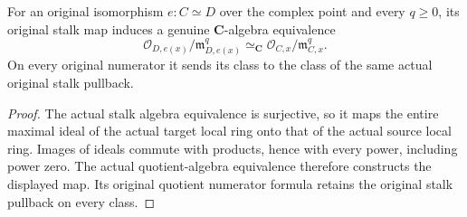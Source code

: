 \begin{theorem}
\label{hir:actual-analytic-subspace-intrinsic-maximal-jets}
\leanok
For an original isomorphism $e:C\simeq D$ over the complex point and every
$q\ge0$, its original stalk map induces a genuine $\mathbf C$-algebra
equivalence
\[
 \mathcal O_{D,e(x)}/\mathfrak m_{D,e(x)}^q
   \simeq_{\mathbf C} \mathcal O_{C,x}/\mathfrak m_{C,x}^q.
\]
On every original numerator it sends its class to the class of the same
actual original stalk pullback.
\end{theorem}
\begin{proof}
The actual stalk algebra equivalence is surjective, so it maps the entire
maximal ideal of the actual target local ring onto that of the actual source
local ring. Images of ideals commute with products, hence with every power,
including power zero. The actual quotient-algebra equivalence therefore
constructs the displayed map. Its original quotient numerator formula
retains the original stalk pullback on every class.
\end{proof}

